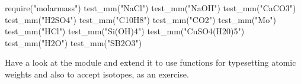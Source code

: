 \begin{texexample}{}{}
\begin{luacode}
   require("molarmass")
   test_mm("NaCl")
   test_mm("NaOH")
   test_mm("CaCO3")
   test_mm("H2SO4")
   test_mm("C10H8")
   test_mm("CO2")
   test_mm("Mo")
   test_mm("HCl")
   test_mm("Si(OH)4")
   test_mm("CuSO4(H20)5")
   test_mm("H2O")
   test_mm("SB2O3")
\end{luacode}
\end{texexample}

Have a look at the module and extend it to use functions for typesetting atomic weights and also to accept isotopes, as an exercise.





